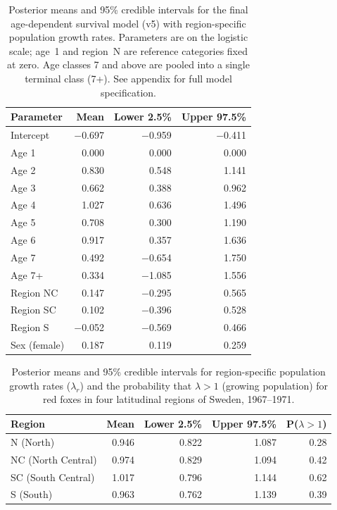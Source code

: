 \documentclass[12pt, a4paper]{article}
\begin{document}
\begin{table}[!htbp]
\centering
\captionsetup{font=scriptsize}
\caption{Posterior means and 95\% credible intervals for the final
         age-dependent survival model (v5) with region-specific population
         growth rates. Parameters are on the logistic scale; age~1 and
         region~N are reference categories fixed at zero. Age classes 7 and
         above are pooled into a single terminal class (7+). See appendix
         for full model specification.}
\label{table:param}
\scriptsize
\begin{tabular}{lrrr}
\toprule
Parameter    & Mean   & Lower 2.5\% & Upper 97.5\% \\
\midrule
Intercept    & $-$0.697 & $-$0.959 & $-$0.411 \\
\midrule
Age 1        &    0.000 &    0.000  &    0.000 \\
Age 2        &    0.830 &    0.548  &    1.141 \\
Age 3        &    0.662 &    0.388  &    0.962 \\
Age 4        &    1.027 &    0.636  &    1.496 \\
Age 5        &    0.708 &    0.300  &    1.190 \\
Age 6        &    0.917 &    0.357  &    1.636 \\
Age 7        &    0.492 & $-$0.654  &    1.750 \\
Age 7+       &    0.334 & $-$1.085  &    1.556 \\
\midrule
Region NC    &    0.147 & $-$0.295  &    0.565 \\
Region SC    &    0.102 & $-$0.396  &    0.528 \\
Region S     & $-$0.052 & $-$0.569  &    0.466 \\
\midrule
Sex (female) &    0.187 &    0.119  &    0.259 \\
\bottomrule
\end{tabular}
\end{table}


\begin{table}[!htbp]
\centering
\captionsetup{font=scriptsize}
\caption{Posterior means and 95\% credible intervals for region-specific
         population growth rates ($\lambda_r$) and the probability that
         $\lambda > 1$ (growing population) for red foxes in four latitudinal
         regions of Sweden, 1967--1971.}
\label{table:lambda}
\scriptsize
\begin{tabular}{lrrrr}
\toprule
Region & Mean & Lower 2.5\% & Upper 97.5\% & P($\lambda > 1$) \\
\midrule
N  (North)         & 0.946 & 0.822 & 1.087 & 0.28 \\
NC (North Central) & 0.974 & 0.829 & 1.094 & 0.42 \\
SC (South Central) & 1.017 & 0.796 & 1.144 & 0.62 \\
S  (South)         & 0.963 & 0.762 & 1.139 & 0.39 \\
\bottomrule
\end{tabular}
\end{table}
\end{document}
